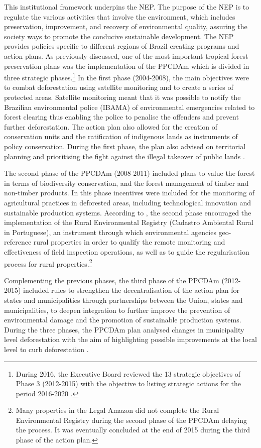 This institutional framework underpins the NEP. The purpose of the NEP is to regulate the various activities that involve the environment, which includes preservation, improvement, and recovery of environmental quality, assuring the society ways to promote the conducive sustainable development. The NEP provides policies specific to different regions of Brazil creating programs and action plans. As previously discussed, one of the most important tropical forest preservation plans was the implementation of the PPCDAm which is divided in three strategic phases.\footnote{During 2016, the Executive Board reviewed the 13 strategic objectives of Phase 3 (2012-2015) with the objective to listing strategic actions for the period 2016-2020 \citep{PPCDAM_2016}.}  In the first phase (2004-2008), the main objectives were to combat deforestation using satellite monitoring and to create a series of protected areas. Satellite monitoring meant that it was possible to notify the Brazilian environmental police (IBAMA) of environmental emergencies related to forest clearing thus enabling the police to penalise the offenders and prevent further deforestation. The action plan also allowed for the creation of conservation units and the ratification of indigenous lands as instruments of policy conservation. During the first phase, the plan also advised on territorial planning and prioritising the fight against the illegal takeover of public lands \citep{ARTAXO}.

The second phase of the PPCDAm (2008-2011) included plans to value the forest in terms of biodiversity conservation, and the forest management of timber and non-timber products. In this phase incentives were included for the monitoring of agricultural practices in deforested areas, including technological innovation and sustainable production systems. According to \citet{ARTAXO}, the second phase encouraged the implementation of the Rural Environmental Registry (Cadastro Ambiental Rural in Portuguese), an instrument through which environmental agencies geo-reference rural properties in order to qualify the remote monitoring and effectiveness of field inspection operations, as well as to guide the regularisation process for rural properties.\footnote{Many properties in the Legal Amazon did not complete the Rural Environmental Registry during the second phase of the PPCDAm delaying the process.  It was eventually concluded at the end of 2015 during the third phase of the action plan.} 

Complementing the previous phases, the third phase of the PPCDAm (2012-2015) included rules to strengthen the decentralisation of the action plan for states and municipalities through partnerships between the Union, states and municipalities, to deepen integration to further improve the prevention of environmental damage and the promotion of sustainable production systems. During the three phases, the PPCDAm plan analysed changes in municipality level deforestation with the aim of highlighting possible improvements at the local level to curb deforestation \citep{SISNAMA}.


